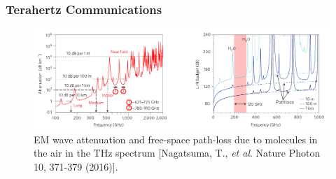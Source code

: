 \documentclass[10pt]{beamer}
\begin{document}
\begin{frame}
    \frametitle{Terahertz Communications}

    \begin{figure}[h!]
        \centering
        \includegraphics[width=.95\textwidth]{THz Attenuation.pdf}
        \caption{EM wave attenuation and free-space path-loss due to  molecules in the air in the THz spectrum \tiny{[Nagatsuma, T., \textit{et al}. Nature Photon 10, 371-379 (2016)]}.}
    \end{figure}
\end{frame}
\end{document}
